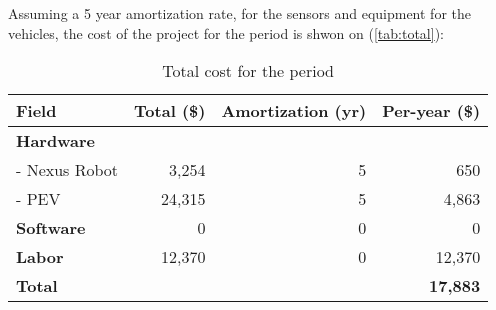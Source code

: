 Assuming a 5 year amortization rate, for the sensors and equipment for the vehicles, the cost of the project for the period is shwon on (\autoref{tab:total}):
\begin{table}[h!]
  \centering
  \begin{tabular}{lrrr}
    \hline
    \textbf{Field}      & \textbf{Total (\$)} & \textbf{Amortization (yr)} & \textbf{Per-year (\$)} \\ \hline
    \textbf{Hardware}   &                     &                            &                        \\
    - Nexus Robot       & 3,254               & 5                          & 650                    \\
    - PEV               & 24,315              & 5                          & 4,863                  \\ \hline
    \textbf{Software}   & 0                   & 0                          & 0                      \\ \hline
    \textbf{Labor}      & 12,370              & 0                          & 12,370                 \\ \hline
    \textbf{Total}      &                     &                            & \textbf{17,883}        \\ \hline
  \end{tabular}
  \caption{Total cost for the period}
  \label{tab:total}
\end{table}